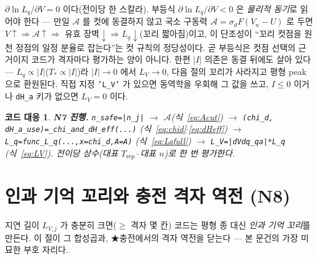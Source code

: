 \documentclass[11pt,a4paper]{article}
\newtheorem*{codebox}{코드 대응}
\newcommand{\rep}{\mathrm{rep}}
\newcommand{\code}[1]{\texttt{#1}}
\begin{document}
$\partial\ln L_q/\partial V=0$ 이다(전이당 한 스칼라). 부등식 $\partial\ln L_q/\partial V<0$ 은 \emph{물리적 동기}로 읽어야
한다 — 만일 $\mathcal A$ 를 컷에 동결하지 않고 국소 구동력 $\mathcal A=\sigma_dF(V_n-U)$ 로 두면 $V\!\uparrow\Rightarrow
\mathcal A\!\uparrow\Rightarrow$ 유효 장벽$\downarrow\Rightarrow L_q\downarrow$(꼬리 짧아짐)이고, 이 단조성이 ``꼬리 컷점을
원천 정점의 일정 분율로 잡는다''는 컷 규칙의 정당성이다. 곧 부등식은 컷점 선택의 근거이지 코드가 격자마다 평가하는 양이
아니다. 한편 $|I|$ 의존은 동결 뒤에도 살아 있다 — $L_q\propto|I|$($T_*\propto|I|$)라 $|I|\to0$
에서 $L_V\to0$, 다음 절의 꼬리가 사라지고 평형 peak 으로 환원된다. 직접 지정 \code{'L\_V'} 가 있으면 동역학을 우회해
그 값을 쓰고, $I\le0$ 이거나 \code{dH\_a} 키가 없으면 $L_V=0$ 이다.

\begin{codebox}
\textbf{N7 진행.} \code{n\_safe=|n\_j|} $\to$ $\mathcal A$(식~\eqref{eq:Acut}) $\to$
\code{(chi\_d, dH\_a\_use)=\_chi\_and\_dH\_eff(...)} (식~\eqref{eq:chid}$\cdot$\eqref{eq:dHeff}) $\to$
\code{L\_q=func\_L\_q(...,x=chi\_d,A=A)} (식~\eqref{eq:Lqfull}) $\to$ \code{L\_V=|dVdq\_qa|*L\_q} (식~\eqref{eq:LV}).
전이당 \emph{상수}(대표 $T_\rep\cdot$대표 $n$)로 한 번 평가한다.
\end{codebox}

\section{인과 기억 꼬리와 충전 격자 역전 (N8)}\label{sec:tail}
지연 길이 $L_{V,j}$ 가 충분히 크면($\ge$ 격자 몇 칸) 코드는 평형 종 대신 \emph{인과 기억 꼬리}를 만든다. 이 절이 그
합성곱과, ★충전에서의 격자 역전을 닫는다 — 본 문건의 가장 미묘한 부호 자리다.
\end{document}
